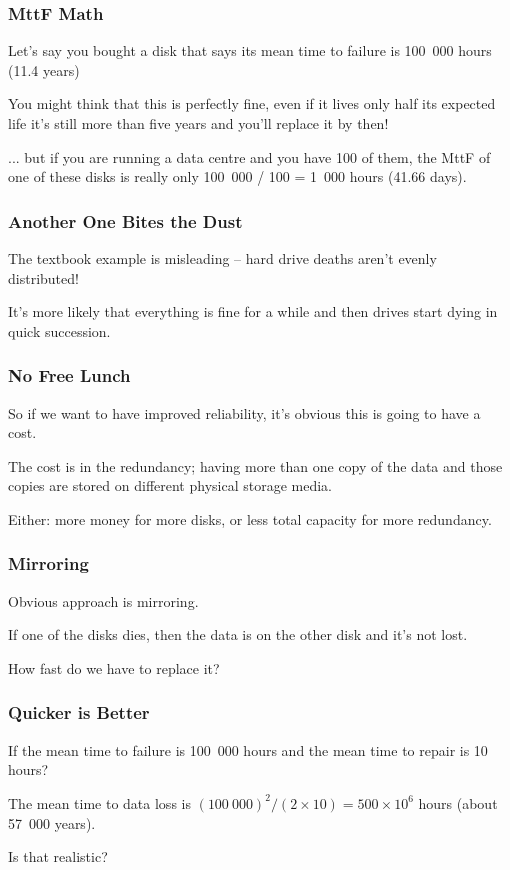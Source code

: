 \begin{frame}
\frametitle{MttF Math}

Let's say you bought a disk that says its mean time to failure is 100~000 hours (11.4 years)

You might think that this is perfectly fine, even if it lives only half its expected life it's still more than five years and you'll replace it by then!

... but if you are running a data centre and you have 100 of them, the MttF of one of these disks is really only 100~000 / 100 = 1~000 hours (41.66 days).

\end{frame}


\begin{frame}
\frametitle{Another One Bites the Dust}

The textbook example is misleading -- hard drive deaths aren't evenly distributed!

It's more likely that everything is fine for a while and then drives start dying in quick succession. 


\end{frame}


\begin{frame}
\frametitle{No Free Lunch}

So if we want to have improved reliability, it's obvious this is going to have a cost. 

The cost is in the redundancy; having more than one copy of the data and those copies are stored on different physical storage media.

Either: more money for more disks, or less total capacity for more redundancy.

\end{frame}


\begin{frame}
\frametitle{Mirroring}

Obvious approach is \alert{mirroring}.

If one of the disks dies, then the data is on the other disk and it's not lost.


How fast do we have to replace it?
\end{frame}


\begin{frame}
\frametitle{Quicker is Better}

If the mean time to failure is 100~000 hours and the mean time to repair is 10 hours?

The mean time to data loss is $(100~000)^{2}/(2 \times 10) = 500 \times 10^{6}$ hours (about 57~000 years).

Is that realistic?

\end{frame}


